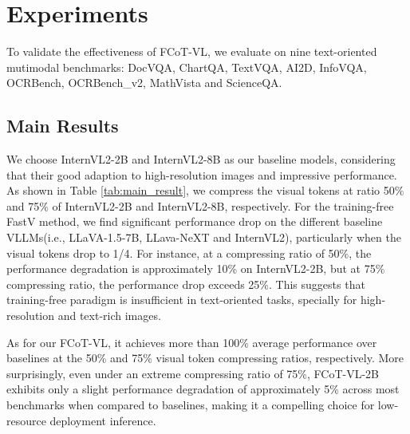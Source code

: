 \section{Experiments}
To validate the effectiveness of FCoT-VL, we evaluate on nine text-oriented mutimodal benchmarks: 
DocVQA\cite{mathew2021docvqa}, ChartQA\cite{masry2022chartqa}, TextVQA\cite{singh2019towards}, AI2D\cite{kembhavi2016diagram}, InfoVQA\cite{mathew2022infographicvqa}, OCRBench\cite{liu2024ocrbench}, OCRBench\_v2\cite{fu2024ocrbench},  MathVista and ScienceQA\cite{lu2022scienceqa}. 

\subsection{Main Results}
We choose InternVL2-2B and InternVL2-8B as our baseline models, considering that their good adaption to high-resolution images and impressive performance.
As shown in Table \ref{tab:main_result}, we compress the visual tokens at ratio 50$\%$ and 75$\%$ of InternVL2-2B and InternVL2-8B, respectively. For the training-free FastV method,
we find significant performance drop on the different baseline VLLMs(i.e., LLaVA-1.5-7B\cite{liu2023improved}, LLava-NeXT\cite{liu2024llava} and InternVL2\cite{chen2024far}), particularly when the visual tokens drop to 1/4. 
For instance, at a compressing ratio of 50\%, the performance degradation is approximately 10\% on InternVL2-2B, but at 75\% compressing ratio, the performance drop exceeds 25\%.
This suggests that training-free
paradigm is insufficient in text-oriented tasks, specially for high-resolution and text-rich images.


As for our FCoT-VL, it achieves more than 100\% average performance over baselines at the 50\% and 75\% visual token compressing ratios, respectively. More surprisingly,
even under an extreme compressing ratio of 75\%, FCoT-VL-2B exhibits only a slight performance degradation of approximately 5\% across most benchmarks when compared to baselines, making it a compelling choice for low-resource deployment inference.

